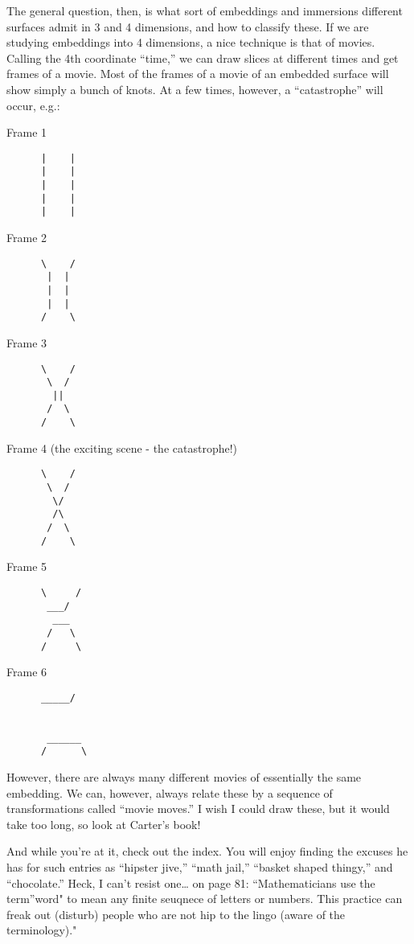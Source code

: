 \documentclass{article}
\begin{document}
The general question, then, is what sort of embeddings and immersions
different surfaces admit in 3 and 4 dimensions, and how to classify
these. If we are studying embeddings into 4 dimensions, a nice technique
is that of movies. Calling the 4th coordinate ``time,'' we can draw
slices at different times and get frames of a movie. Most of the frames
of a movie of an embedded surface will show simply a bunch of knots. At
a few times, however, a ``catastrophe'' will occur, e.g.:

Frame 1

\begin{verbatim}
      |    |
      |    |
      |    |
      |    |
      |    |
\end{verbatim}

Frame 2

\begin{verbatim}
      \    /
       |  |
       |  |
       |  |
      /    \
\end{verbatim}

Frame 3

\begin{verbatim}
      \    /
       \  /
        ||
       /  \
      /    \
\end{verbatim}

Frame 4 (the exciting scene - the catastrophe!)

\begin{verbatim}
      \    /
       \  /
        \/
        /\
       /  \
      /    \
\end{verbatim}

Frame 5

\begin{verbatim}
      \     /
       ___/
        ___
       /   \
      /     \
\end{verbatim}

Frame 6

\begin{verbatim}
      _____/
      
      
       ______     
      /      \
\end{verbatim}

However, there are always many different movies of essentially the same
embedding. We can, however, always relate these by a sequence of
transformations called ``movie moves.'' I wish I could draw these, but
it would take too long, so look at Carter's book!

And while you're at it, check out the index. You will enjoy finding the
excuses he has for such entries as ``hipster jive,'' ``math jail,''
``basket shaped thingy,'' and ``chocolate.'' Heck, I can't resist
one\ldots{} on page 81: ``Mathematicians use the term''word" to mean any
finite seuqnece of letters or numbers. This practice can freak out
(disturb) people who are not hip to the lingo (aware of the
terminology)."
\end{document}

